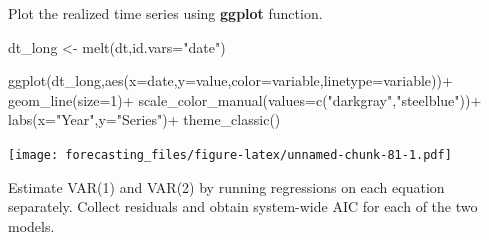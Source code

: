\documentclass[
  12pt,
  oneside]{book}
\newenvironment{Shaded}{\begin{snugshade}}{\end{snugshade}}
\newcommand{\AttributeTok}[1]{\textcolor[rgb]{0.77,0.63,0.00}{#1}}
\newcommand{\DecValTok}[1]{\textcolor[rgb]{0.00,0.00,0.81}{#1}}
\newcommand{\FunctionTok}[1]{\textcolor[rgb]{0.00,0.00,0.00}{#1}}
\newcommand{\NormalTok}[1]{#1}
\newcommand{\OtherTok}[1]{\textcolor[rgb]{0.56,0.35,0.01}{#1}}
\newcommand{\SpecialCharTok}[1]{\textcolor[rgb]{0.00,0.00,0.00}{#1}}
\newcommand{\StringTok}[1]{\textcolor[rgb]{0.31,0.60,0.02}{#1}}
\begin{document}
Plot the realized time series using \textbf{ggplot} function.

\begin{Shaded}
\begin{Highlighting}[]
\NormalTok{dt\_long }\OtherTok{\textless{}{-}} \FunctionTok{melt}\NormalTok{(dt,}\AttributeTok{id.vars=}\StringTok{"date"}\NormalTok{)}

\FunctionTok{ggplot}\NormalTok{(dt\_long,}\FunctionTok{aes}\NormalTok{(}\AttributeTok{x=}\NormalTok{date,}\AttributeTok{y=}\NormalTok{value,}\AttributeTok{color=}\NormalTok{variable,}\AttributeTok{linetype=}\NormalTok{variable))}\SpecialCharTok{+}
  \FunctionTok{geom\_line}\NormalTok{(}\AttributeTok{size=}\DecValTok{1}\NormalTok{)}\SpecialCharTok{+}
  \FunctionTok{scale\_color\_manual}\NormalTok{(}\AttributeTok{values=}\FunctionTok{c}\NormalTok{(}\StringTok{"darkgray"}\NormalTok{,}\StringTok{"steelblue"}\NormalTok{))}\SpecialCharTok{+}
  \FunctionTok{labs}\NormalTok{(}\AttributeTok{x=}\StringTok{"Year"}\NormalTok{,}\AttributeTok{y=}\StringTok{"Series"}\NormalTok{)}\SpecialCharTok{+}
  \FunctionTok{theme\_classic}\NormalTok{()}
\end{Highlighting}
\end{Shaded}

\texttt{[image: forecasting\_files/figure-latex/unnamed-chunk-81-1.pdf]}

Estimate VAR(1) and VAR(2) by running regressions on each equation separately. Collect residuals and obtain system-wide AIC for each of the two models.
\end{document}
